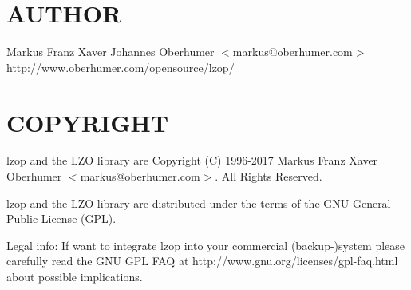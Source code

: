 \section{AUTHOR\label{AUTHOR}}


Markus Franz Xaver Johannes Oberhumer
$<$markus@oberhumer.com$>$
http://www.oberhumer.com/opensource/lzop/

\section{COPYRIGHT\label{COPYRIGHT}}


lzop and the LZO library are
Copyright (C) 1996-2017 Markus Franz Xaver Oberhumer $<$markus@oberhumer.com$>$.
All Rights Reserved.



lzop and the LZO library are distributed under the terms
of the GNU General Public License (GPL).



Legal info: If want to integrate lzop into your commercial (backup-)system
please carefully read the GNU GPL FAQ at http://www.gnu.org/licenses/gpl-faq.html
about possible implications.

